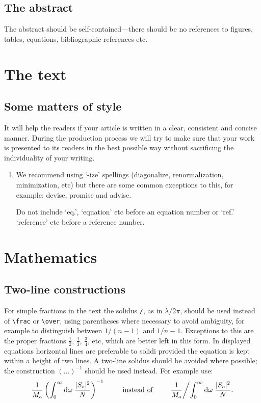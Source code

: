\documentclass[12pt]{iopart}
\begin{document}
\subsection{The abstract}
The abstract should be self-contained---there should be no references to
figures, tables, equations, bibliographic references etc.

\section{The text}

\subsection{Some matters of style}
It will help the readers if your article is written in a clear,
consistent and concise manner. During the production process
we will try to make sure that your work is presented to its
readers in the best possible way without sacrificing the individuality of
your writing.

\begin{enumerate}
\item We recommend using `-ize' spellings (diagonalize,
renormalization, minimization, etc) but there are some common
exceptions to this, for example: devise,
promise and advise.

Do not include `eq.', `equation' etc before an equation number or `ref.'\, `reference' etc before a reference number.
\end{enumerate}

\section{Mathematics}
\subsection{Two-line constructions}
For simple fractions in the text the solidus \verb"/", as in
$\lambda/2\pi$, should be used instead of \verb"\frac" or \verb"\over",
using parentheses where necessary to avoid ambiguity,
for example to distinguish between $1/(n-1)$ and $1/n-1$. Exceptions to
this are the proper fractions $\frac12$, $\frac13$, $\frac34$,
etc, which are better left in this form. In displayed equations
horizontal lines are preferable to solidi provided the equation is
kept within a height of two lines. A two-line solidus should be
avoided where possible; the construction $(\ldots)^{-1}$ should be
used instead. For example use:
\begin{equation*}
\frac{1}{M_{\rm a}}\left(\int^\infty_0{\rm d}
\omega\;\frac{|S_o|^2}{N}\right)^{-1}\qquad\mbox{instead of}\qquad
\frac{1}{M_{\rm a}}\biggl/\int^\infty_0{\rm d}
\omega\;\frac{|S_o|^2}{N}.
\end{equation*}
\end{document}
